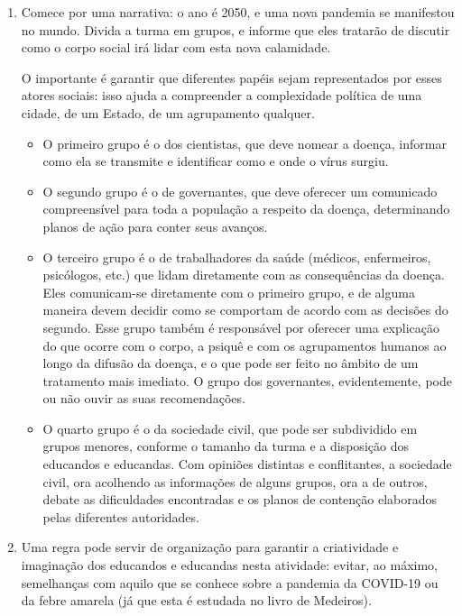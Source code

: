 \documentclass[12pt]{extarticle}
\begin{document}
\begin{enumerate}
\item Comece por uma narrativa: o ano é 2050, e uma nova pandemia se
manifestou no mundo. Divida a turma em grupos, e informe que eles
tratarão de discutir como o corpo social irá lidar com esta nova
calamidade.

O importante é garantir que diferentes papéis sejam representados por
esses atores sociais: isso ajuda a compreender a complexidade política
de uma cidade, de um Estado, de um agrupamento qualquer.

\begin{itemize}
\item O primeiro grupo é o dos cientistas, que deve nomear a doença, informar
como ela se transmite e identificar como e onde o vírus surgiu.

\item O segundo grupo é o de governantes, que deve oferecer um comunicado
compreensível para toda a população a respeito da doença, determinando
planos de ação para conter seus avanços.

\item O terceiro grupo é o de trabalhadores da saúde (médicos, enfermeiros,
psicólogos, etc.) que lidam diretamente com as consequências da doença.
Eles comunicam-se diretamente com o primeiro grupo, e de alguma maneira
devem decidir como se comportam de acordo com as decisões do segundo.
Esse grupo também é responsável por oferecer uma explicação do que
ocorre com o corpo, a psiquê e com os agrupamentos humanos ao longo da
difusão da doença, e o que pode ser feito no âmbito de um tratamento
mais imediato. O grupo dos governantes, evidentemente, pode ou não ouvir
as suas recomendações.

\item O quarto grupo é o da sociedade civil, que pode ser subdividido em
grupos menores, conforme o tamanho da turma e a disposição dos educandos
e educandas. Com opiniões distintas e conflitantes, a sociedade civil,
ora acolhendo as informações de alguns grupos, ora a de outros, debate
as dificuldades encontradas e os planos de contenção elaborados pelas
diferentes autoridades.
\end{itemize}

\item Uma regra pode servir de organização para garantir a criatividade e
imaginação dos educandos e educandas nesta atividade: evitar, ao máximo,
semelhanças com aquilo que se conhece sobre a pandemia da COVID-19 ou da
febre amarela (já que esta é estudada no livro de Medeiros).


\end{enumerate}
\end{document}

